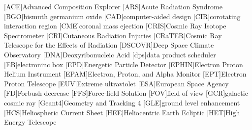 	\begin{acronym}\itemsep0pt
	[ACE]{Advanced Composition Explorer}
	[ARS]{Acute Radiation Syndrome}
	[BGO]{bismuth germanium oxide}
	[CAD]{computer-aided design}
	[CIR]{corotating interaction region}
	[CME]{coronal mass ejection}
	[CRIS]{Cosmic Ray Isotope Spectrometer}
	[CRI]{Cutaneous Radiation Injuries}
	[CRaTER]{Cosmic Ray Telescope for the Effects of Radiation}
	[DSCOVR]{Deep Space Climate Observatory}
	[DNA]{Deoxyribonucleic Acid}
	[dps]{data product scheduler}
	[EB]{electroninc box}
	[EPD]{Energetic Particle Detector}
	[EPHIN]{Electron Proton Helium Instrument}
	[EPAM]{Electron, Proton, and Alpha Monitor}
	[EPT]{Electron Proton Telescope}
	[EUV]{Extreme ultraviolet}
	[ESA]{European Space Agency}
	[FD]{Forbush decrease}
	[FFS]{Force-field Solution}
	[FOV]{field of view}
	[GCR]{galactic cosmic ray}
	[Geant4]{Geometry and Tracking 4}
	[GLE]{ground level enhancement}
	[HCS]{Heliospheric Current Sheet}
	[HEE]{Heliocentric Earth Ecliptic}
	[HET]{High Energy Telescope}

\end{acronym}
